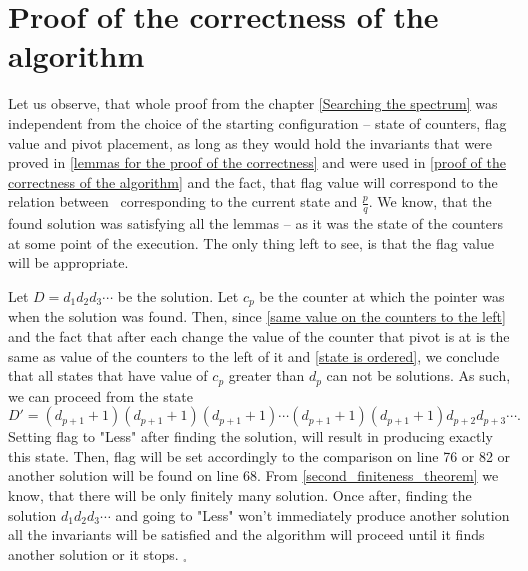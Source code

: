 \section{Proof of the correctness of the algorithm}
Let us observe, that whole proof from the chapter \ref{Searching the spectrum} 
was independent from the choice of 
the starting configuration -- state of counters, flag value and pivot placement, as 
long as they would hold the invariants that were proved in 
\ref{lemmas for the proof of the correctness} and were used in 
\ref{proof of the correctness of the algorithm} and the fact, that flag value will 
correspond to the relation between \Eoc\ corresponding to the current state and $\frac{p}{q}$. 
We know, that the found solution was satisfying all the lemmas -- as it was the state of 
the counters at some point of the execution. The only thing left to see, is that 
the flag value will be appropriate. 

Let $D = d_1d_2d_3\cdots$ be the solution. 
Let $c_p$ be the counter at which the pointer was when the solution was found. Then, since 
\ref{same value on the counters to the left} and the fact that after each change the value of 
the counter that pivot is at is the same as value of the counters to the left of it 
and \ref{state is ordered}, we conclude 
that 
all states that have value of $c_p$ greater than $d_p$ can not be solutions. 
As such, we can proceed from the state 
\begin{equation}
D' = (d_{p+1}+1)(d_{p+1}+1)(d_{p+1}+1)\cdots (d_{p+1}+1)(d_{p+1}+1)d_{p+2}d_{p+3}\cdots.
\end{equation}
Setting flag to "Less" after finding the solution, will result in producing exactly this state. 
Then, flag will be set accordingly to the comparison on line 76 or 82 or another solution will 
be found on line 68. 
From \ref{second_finiteness_theorem} we know, that there will be only finitely many 
solution. 
Once after, finding the solution $d_1d_2d_3\cdots$ and going to "Less" won't immediately produce 
another solution 
all the invariants will be satisfied and the algorithm will proceed 
until it finds another solution or it stops. 
$_\square$

